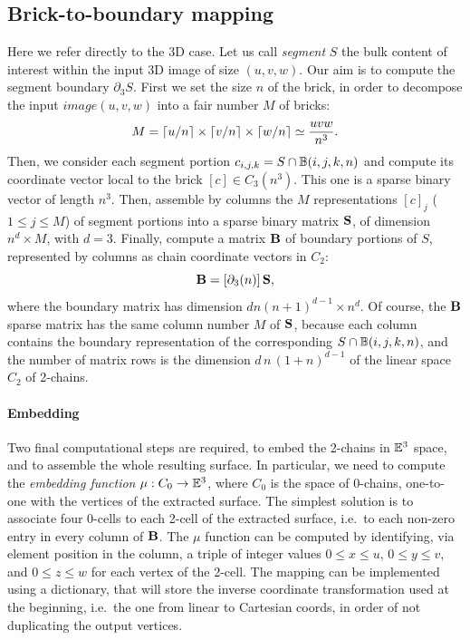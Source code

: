 \subsection{Brick-to-boundary mapping}\label{sec:brick-mapping}

Here we refer directly to the 3D case.
Let us call \emph{segment} $S$ the bulk content of interest within the input 3D image of size $(u,v,w)$. Our aim is to compute the segment boundary $\partial_3 S$. 
First we set the size $n$ of the brick, in order to decompose the input $image(u,v,w)$ into a fair number  $M$ of bricks:
\[
M = \left\lceil u/n \right\rceil \times \left\lceil v/n \right\rceil \times \left\lceil w/n \right\rceil \simeq \frac{uvw}{n^3}.
\] 
Then, we consider each segment portion $c_{i,j,k} = S \cap \mathbb{B}(i,j,k,n)$ and compute its coordinate vector local to the brick $[c]\in C_3(n^3)$. This one is a sparse binary vector of length $n^3$. Then, assemble by columns the $M$ representations $[c]_j$ ($1\leq j\leq M$) of segment portions into a sparse binary matrix ${\bf S}$, of dimension $n^d \times M$, with $d=3$. Finally, compute a matrix ${\bf \textbf{B}}$ of boundary portions of $S$, represented by columns as chain coordinate vectors in $C_2$:
\[
{\bf \textbf{B}} = [\partial_3(n)]\, {\bf S},
\]
where the boundary matrix has dimension $dn(n+1)^{d-1} \times n^d$.
Of course, the ${\bf \textbf{B}}$ sparse matrix has the same column number $M$ of ${\bf S}$, because each column contains the boundary representation of the corresponding $S \cap \mathbb{B}(i,j,k,n)$, and the number of matrix rows is the dimension $d\,n\,(1+n)^{d-1}$ of the linear space $C_2$ of 2-chains.

\paragraph{Embedding}
Two final computational steps are required, to embed the 2-chains in $\mathbb{E}^3$ space, and to assemble the whole resulting surface. In particular, we need to compute the \emph{embedding function} $\mu : C_0 \to \mathbb{E}^3$, where $C_0$ is the space of 0-chains, one-to-one with the vertices of the extracted surface. The simplest solution is to associate  four 0-cells to each 2-cell of the extracted surface, i.e.~to each non-zero entry in every column of ${\bf \textbf{B}}$.  The $\mu$ function  can be computed by identifying, via  element position in the column, a triple of integer values $0\leq x\leq u$, $0\leq y\leq v$, and $0\leq z\leq w$ for each vertex of the 2-cell.  The mapping can be implemented using a dictionary, that will store the inverse coordinate transformation used at the beginning, i.e.~the one from linear to Cartesian coords, in order of not duplicating the output vertices.   

